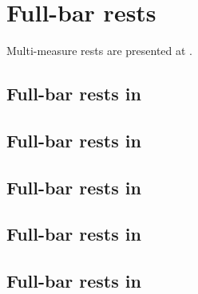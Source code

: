 



\chapter{Full-bar rests}\label{Full-bar rests}

Multi-measure rests are presented at .


\section{Full-bar rests in \mxsrToMsr{}}


\section{Full-bar rests in \mxsrToMsr{}}


\section{Full-bar rests in \msrToMsr{}}


\section{Full-bar rests in \msrToLpsr{}}


\section{Full-bar rests in \lpsrToLilypond{}}


